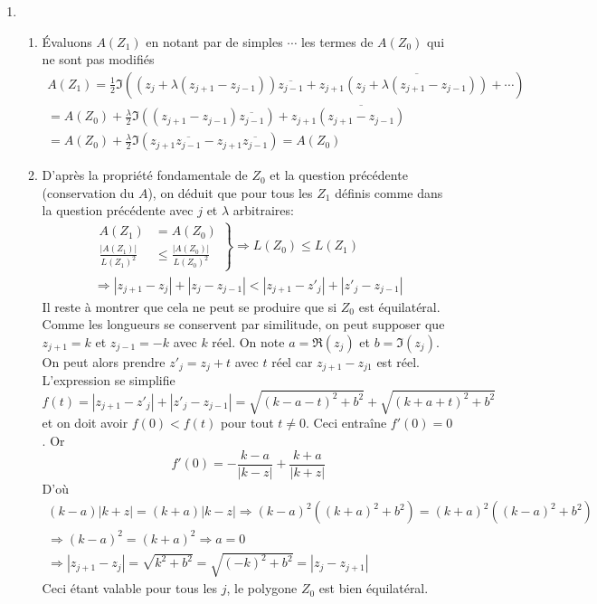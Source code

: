 \begin{enumerate}
 \item
\begin{enumerate}
 \item \'Evaluons $A(Z_1)$ en notant par de simples $\cdots$ les termes de $A(Z_0)$ qui ne sont pas modifiés
\begin{multline*}
 A(Z_1)=
\frac{1}{2}\Im
\left( 
\left(z_j+\lambda(z_{j+1}-z_{j-1}) \right)\overline{z_{j-1}}
+ z_{j+1}\overline{\left(z_j+\lambda(z_{j+1}-z_{j-1}) \right)}
+\cdots 
\right) \\
=A(Z_0)
+  \frac{\lambda}{2}\Im
\left( 
(z_{j+1}-z_{j-1})\overline{z_{j-1}}\right)
+ z_{j+1}\overline{(z_{j+1}-z_{j-1})}\\
=A(Z_0)
+  \frac{\lambda}{2}\Im
\left( 
z_{j+1}\overline{z_{j-1}}
- z_{j+1}\overline{z_{j-1}}\right)
= A(Z_0)
\end{multline*}
  
 \item D'après la propriété fondamentale de $Z_0$ et la question précédente (conservation du $A$), on déduit que pour tous les $Z_1$ définis comme dans la question précédente avec $j$ et $\lambda$ arbitraires:
\begin{multline*}
 \left. 
\begin{aligned}
 A(Z_1) &= A(Z_0)\\
\frac{|A(Z_1)|}{L(Z_1)^2} &\leq \frac{|A(Z_0)|}{L(Z_0)^2}
\end{aligned}
\right\rbrace \Rightarrow
L(Z_0) \leq L(Z_1) \\
\Rightarrow
 |z_{j+1}-z_j|+|z_j-z_{j-1}| < |z_{j+1}-z'_j|+|z'_j-z_{j-1}|
\end{multline*}
Il reste à montrer que cela ne peut se produire que si $Z_0$ est équilatéral.\newline
Comme les longueurs se conservent par similitude, on peut supposer que $z_{j+1}=k$ et $z_{j-1}=-k$ avec $k$ réel. On note $a=\Re(z_j)$ et $b=\Im(z_j)$. On peut alors prendre $z'_j=z_j+t$ avec $t$ réel car $z_{j+1}-z_{j1}$ est réel. L'expression se simplifie
\begin{displaymath}
 f(t)= |z_{j+1}-z'_j|+|z'_j-z_{j-1}|
= \sqrt{(k-a-t)^2+b^2}+\sqrt{(k+a+t)^2+b^2}
\end{displaymath}
et on doit avoir $f(0)<f(t)$ pour tout $t \neq 0$. Ceci entraîne $f'(0)=0$.\newline
Or
\begin{displaymath}
 f'(0)=
-\frac{k-a}{|k-z|}+\frac{k+a}{|k+z|}
\end{displaymath}
 D'où
\begin{multline*}
 (k-a)|k+z|=(k+a)|k-z|
\Rightarrow
(k-a)^2\left((k+a)^2+b^2 \right) =  (k+a)^2\left((k-a)^2+b^2 \right)\\
\Rightarrow
(k-a)^2 = (k+a)^2
\Rightarrow a = 0 \\
\Rightarrow |z_{j+1}-z_j|= \sqrt{k^2 + b^2} = \sqrt{(-k)^2 + b^2} =|z_j-z_{j+1}|
\end{multline*}
Ceci étant valable pour tous les $j$, le polygone $Z_0$ est bien équilatéral.


\end{enumerate}
\end{enumerate}
